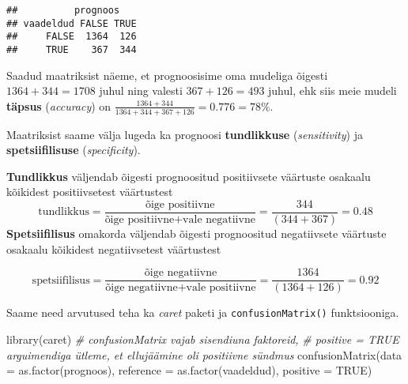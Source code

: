 \documentclass[
]{book}
\newenvironment{Shaded}{\begin{snugshade}}{\end{snugshade}}
\newcommand{\AttributeTok}[1]{\textcolor[rgb]{0.77,0.63,0.00}{#1}}
\newcommand{\CommentTok}[1]{\textcolor[rgb]{0.56,0.35,0.01}{\textit{#1}}}
\newcommand{\FloatTok}[1]{\textcolor[rgb]{0.00,0.00,0.81}{#1}}
\newcommand{\FunctionTok}[1]{\textcolor[rgb]{0.00,0.00,0.00}{#1}}
\newcommand{\NormalTok}[1]{#1}
\newcommand{\OtherTok}[1]{\textcolor[rgb]{0.56,0.35,0.01}{#1}}
\newcommand{\SpecialCharTok}[1]{\textcolor[rgb]{0.00,0.00,0.00}{#1}}
\newcommand{\StringTok}[1]{\textcolor[rgb]{0.31,0.60,0.02}{#1}}
\begin{document}
\begin{Shaded}
\end{Shaded}

\begin{verbatim}
##          prognoos
## vaadeldud FALSE TRUE
##     FALSE  1364  126
##     TRUE    367  344
\end{verbatim}

Saadud maatriksist näeme, et prognoosisime oma mudeliga õigesti \(1364 + 344 = 1708\) juhul ning valesti \(367+126 = 493\) juhul, ehk siis meie mudeli \textbf{täpsus} (\emph{accuracy}) on \(\frac{1364 + 344}{1364 + 344 + 367+126} = 0.776 = 78\%\).

Maatriksist saame välja lugeda ka prognoosi \textbf{tundlikkuse} (\emph{sensitivity}) ja \textbf{spetsiifilisuse} (\emph{specificity}).

\textbf{Tundlikkus} väljendab õigesti prognoositud positiivsete väärtuste osakaalu kõikidest positiivsetest väärtustest
\[\text{tundlikkus} = \frac{\text{õige positiivne}}{\text{õige positiivne} + \text{vale negatiivne}} = \frac{344}{(344+367)} = 0.48\]
\textbf{Spetsiifilisus} omakorda väljendab õigesti prognoositud negatiivsete väärtuste osakaalu kõikidest negatiivsetest väärtustest

\[\text{spetsiifilisus} = \frac{\text{õige negatiivne}}{\text{õige negatiivne} + \text{vale positiivne}} = \frac{1364}{(1364+126)} = 0.92\]

Saame need arvutused teha ka \emph{caret} paketi ja \texttt{confusionMatrix()} funktsiooniga.

\begin{Shaded}
\begin{Highlighting}[]
\FunctionTok{library}\NormalTok{(caret)}
\CommentTok{\# confusionMatrix vajab sisendiuna faktoreid, }
\CommentTok{\# positive = TRUE arguimendiga ütleme, et ellujäämine oli positiivne sündmus}
\FunctionTok{confusionMatrix}\NormalTok{(}\AttributeTok{data =} \FunctionTok{as.factor}\NormalTok{(prognoos), }
                \AttributeTok{reference =} \FunctionTok{as.factor}\NormalTok{(vaadeldud), }\AttributeTok{positive =} \StringTok{\textquotesingle{}TRUE\textquotesingle{}}\NormalTok{)}
\end{Highlighting}
\end{Shaded}
\end{document}
